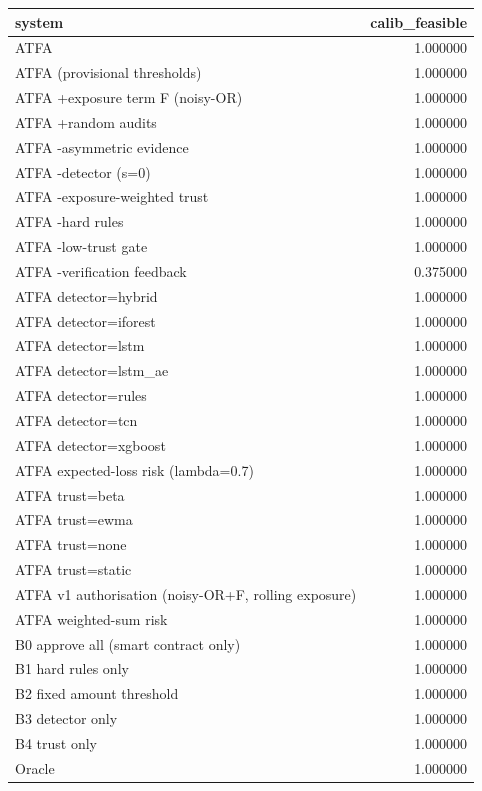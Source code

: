 \begin{tabular}{lr}
\toprule
system & calib\_feasible \\
\midrule
ATFA & 1.000000 \\
ATFA (provisional thresholds) & 1.000000 \\
ATFA +exposure term F (noisy-OR) & 1.000000 \\
ATFA +random audits & 1.000000 \\
ATFA -asymmetric evidence & 1.000000 \\
ATFA -detector (s=0) & 1.000000 \\
ATFA -exposure-weighted trust & 1.000000 \\
ATFA -hard rules & 1.000000 \\
ATFA -low-trust gate & 1.000000 \\
ATFA -verification feedback & 0.375000 \\
ATFA detector=hybrid & 1.000000 \\
ATFA detector=iforest & 1.000000 \\
ATFA detector=lstm & 1.000000 \\
ATFA detector=lstm\_ae & 1.000000 \\
ATFA detector=rules & 1.000000 \\
ATFA detector=tcn & 1.000000 \\
ATFA detector=xgboost & 1.000000 \\
ATFA expected-loss risk (lambda=0.7) & 1.000000 \\
ATFA trust=beta & 1.000000 \\
ATFA trust=ewma & 1.000000 \\
ATFA trust=none & 1.000000 \\
ATFA trust=static & 1.000000 \\
ATFA v1 authorisation (noisy-OR+F, rolling exposure) & 1.000000 \\
ATFA weighted-sum risk & 1.000000 \\
B0 approve all (smart contract only) & 1.000000 \\
B1 hard rules only & 1.000000 \\
B2 fixed amount threshold & 1.000000 \\
B3 detector only & 1.000000 \\
B4 trust only & 1.000000 \\
Oracle & 1.000000 \\
\bottomrule
\end{tabular}
